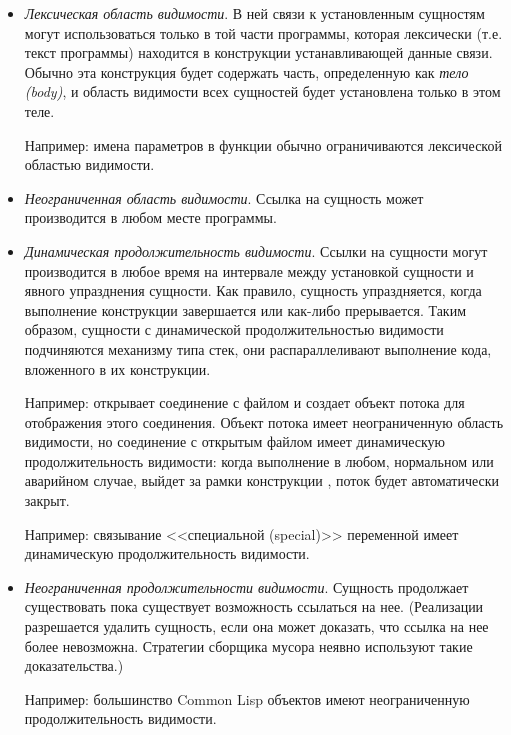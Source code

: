 \begin{itemize}

\item 
\emph{Лексическая область видимости}. В ней связи к установленным сущностям могут
использоваться только в той части программы, которая лексически (т.е. текст
программы) находится в конструкции устанавливающей данные связи. Обычно эта
конструкция будет содержать часть, определенную как \emph{тело (body)}, и область
видимости всех сущностей будет установлена только в этом теле.

Например: имена параметров в функции обычно ограничиваются лексической областью
видимости.

\item
\emph{Неограниченная область видимости}. Ссылка на сущность может производится в
любом месте программы.

\item
\emph{Динамическая продолжительность видимости}. Ссылки на сущности могут
производится в любое время на интервале между установкой сущности и явного
упразднения сущности. Как правило, сущность упраздняется, когда выполнение конструкции
завершается или как-либо прерывается. Таким образом, сущности с динамической
продолжительностью видимости подчиняются механизму типа стек, они распараллеливают
выполнение кода, вложенного в их конструкции.

Например:  открывает соединение с файлом и создает объект
потока для отображения этого соединения. Объект потока имеет неограниченную область
видимости, но соединение с открытым файлом имеет динамическую продолжительность
видимости: когда выполнение в любом, нормальном или аварийном случае, выйдет за
рамки конструкции , поток будет автоматически закрыт.

Например: связывание <<специальной (special)>> переменной имеет динамическую
продолжительность видимости.

\item
\emph{Неограниченная продолжительности видимости}. Сущность продолжает существовать
пока существует возможность ссылаться на нее. (Реализации разрешается удалить
сущность, если она может доказать, что ссылка на нее более невозможна. Стратегии
сборщика мусора неявно используют такие доказательства.)

Например: большинство Common Lisp объектов имеют неограниченную продолжительность
видимости.


\end{itemize}
